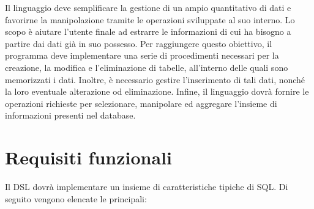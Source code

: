 \documentclass[12pt,a4paper,openright,twoside]{book}
\begin{document}
Il linguaggio deve semplificare la gestione di un ampio quantitativo di dati e favorirne la manipolazione tramite le operazioni 
sviluppate al suo interno. Lo scopo è aiutare l’utente finale ad estrarre le informazioni di cui ha bisogno a partire dai dati già in suo 
possesso. Per raggiungere questo obiettivo, il programma deve implementare una serie di procedimenti necessari per la creazione, la modifica e 
l’eliminazione di tabelle, all’interno delle quali sono memorizzati i dati. Inoltre, è necessario gestire l’inserimento di tali dati, nonché 
la loro eventuale alterazione od eliminazione. Infine, il linguaggio dovrà fornire le operazioni richieste per selezionare, manipolare ed 
aggregare l’insieme di informazioni presenti nel database.

\section{Requisiti funzionali}
\label{sec:requisiti-funzionali}
Il \ac{DSL} dovrà implementare un insieme di caratteristiche tipiche di \ac{SQL}. Di seguito vengono elencate 
le principali:
\end{document}
